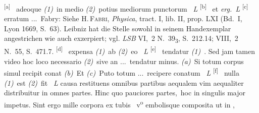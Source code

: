 {{{%
\textsuperscript{[a]}~%
adeoque
\textit{(1)}~in medio
\textit{(2)}~potius mediorum punctorum%
~\textit{L}
\quad
\textsuperscript{[b]}~%
et
\textit{erg.~L}
\quad
\textsuperscript{[c]}~%
erratum \lbrack...\rbrack\ Fabry:
Siehe H.\,\textsc{Fabri}, \textit{Physica}, tract. I, lib. II, prop. LXI (Bd.~I, Lyon 1669, S.~63).\cite{00044}
Leibniz hat die Stelle sowohl in seinem Handexemplar angestrichen wie auch exzerpiert; vgl. \textit{LSB} VI,~2 N.~39\textsubscript{3}, S.~212.14;\cite{01234} VIII,~2 N.~55, S.~471.7.\cite{01120}
\quad
\textsuperscript{[d]}~%
expensa
\textit{(1)}~ab
\textit{(2)}~eo%
~\textit{L}
\quad
\textsuperscript{[e]}~%
tendatur
\textit{(1)}~. Sed jam tamen video hoc loco necessario
\textit{(2)}~sive an \lbrack...\rbrack\ tendatur minus.
\textit{(a)}~Si totum corpus simul recipit conat
\textit{(b)}~Et
\textit{(c)}~Puto totum \lbrack...\rbrack\ recipere conatum%
~\textit{L}
\quad
\textsuperscript{[f]}~%
nulla
\textit{(1)}~est
\textit{(2)}~fit%
~\textit{L}}}}%
causa restituens\protect{}
omnibus partibus aequalem vim
aequaliter distribuitur in omnes partes.\protect{}
Hinc quo pauciores partes\lbrack,\rbrack\
hoc in singulis major impetus.\protect{}
Sint ergo mille corpora ex tubis\protect\index{Sachverzeichnis}{tubum}
%
{\normalsize{~v\textsuperscript{o}\rbrack}} %
%
embolisque\protect{} composita ut in
%
\lbrack,\rbrack\
